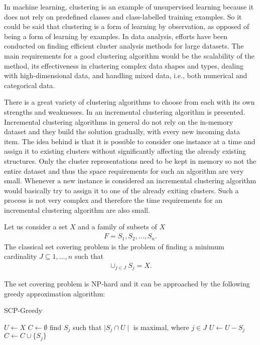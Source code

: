 In machine learning, clustering is an example of unsupervised learning because it does not rely on predefined classes and class-labelled training examples. So it could be said that clustering is a form of learning by observation, as opposed of being a form of learning by examples. In data analysis, efforts have been conducted on finding efficient  cluster analysis methods for  large datasets. The main requirements for a good clustering algorithm would be the scalability of the method, its effectiveness in clustering complex data shapes and types, dealing with high-dimensional data, and handling mixed data, i.e.,  both numerical and categorical data.

There is a great variety of clustering algorithms to choose from each with its own strengths and weaknesses. In \cite{Gaceanu11AnIncremental} an incremental clustering algorithm is presented. Incremental clustering algorithms in general do not rely on the in-memory dataset and they build the solution gradually, with every new incoming data item. The idea behind is that it is possible to consider one instance at a time and assign it to existing clusters without significantly affecting the already existing structures. Only the cluster representations need to be kept in memory so not the entire dataset and thus the space requirements for such an algorithm are very small. Whenever a new instance is considered an incremental clustering algorithm would basically try to assign it to one of the already exiting clusters. Such a process is not very complex and therefore the time requirements for an incremental clustering algorithm are also small.

Let us consider a set $X$ and a family of subsets of $X$ 
\begin{align}
F= S_{1}, S_{2}, \dots , S_{n}.
\end{align}
The classical set covering problem is the problem of finding a minimum cardinality $J \subseteq {1, \dots, n}$ such that
\begin{align}
\cup_{j \in J} S_{j} = X.
\end{align}

The set covering problem is NP-hard \cite{Cormen09Introduction} and it can be approached by the following greedy approximation algorithm:
\begin{algorithm}
\caption{SCP-Greedy}
\label{alg:SCP-Greedy}
\begin{algorithmic}[1]
\STATE $U \leftarrow X$
\STATE $C \leftarrow \emptyset$
\STATE find $S_{j}$ such that $\mid S_{j} \cap U \mid $ is maximal, where $j \in J$
\STATE $U \leftarrow U - S_{j}$
\STATE $C \leftarrow C \cup \{S_{j}\}$
\ENDWHILE
\end{algorithmic}
\end{algorithm}

